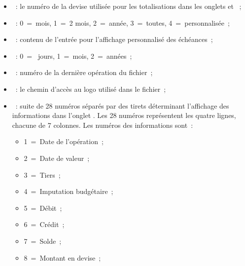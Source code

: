 \begin{itemize}
\item {}~: le numéro de
la devise utilisée pour les totalisations dans les onglets 
 et ~;

\item {}~: 0~=~mois,
1~=~2 mois, 2~=~année, 3~=~toutes, 4~=~personnalisée~;

\item {}~: 
contenu de l'entrée pour l'affichage personnalisé des échéances~;

\item {}~: 0~=~
jours, 1~=~mois, 2~=~années~;

\item {}~: numéro de la 
dernière opération du fichier~;

\item {}~: le chemin d'accès au logo utilisé dans le fichier~; 

\item {}~: suite de 28 numéros séparés par des tirets déterminant l'affichage des informations dans l'onglet .  Les 28 numéros représentent les quatre lignes, chacune de 7 colonnes. Les numéros des informations sont~:

	\begin{itemize}

	\item 1~=~Date de l'opération~;

	\item 2~=~Date de valeur~;

	\item 3~=~Tiers~;

	\item 4~=~Imputation budgétaire~;

	\item 5~=~Débit~;

	\item 6~=~Crédit~;

	\item 7~=~Solde~;

	\item 8~=~Montant en devise~;


\end{itemize}
\end{itemize}
